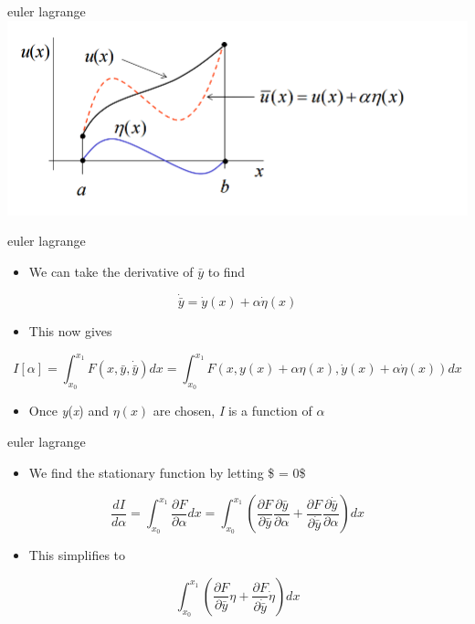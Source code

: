 \documentclass[
  letterpaper,
  ignorenonframetext,
  aspectratio=43,
  handout,
  12pt]{beamer}
\providecommand{\tightlist}{%
  \setlength{\itemsep}{0pt}\setlength{\parskip}{0pt}}
\providecommand{\tightlist}{%
\setlength{\itemsep}{0pt}\setlength{\parskip}{0pt}}
\let\Oldincludegraphics\includegraphics
\renewcommand{\includegraphics}[2][]{\Oldincludegraphics[width=\textwidth,height=0.7\textheight,keepaspectratio]{#2}}
\begin{document}
\begin{frame}{euler lagrange}
\protect\hypertarget{euler-lagrange-2}{}
\includegraphics{../images/variation.PNG}
\end{frame}

\begin{frame}{euler lagrange}
\protect\hypertarget{euler-lagrange-3}{}
\begin{itemize}
\tightlist
\item
  We can take the derivative of \(\bar{y}\) to find
\end{itemize}

\[\dot{\bar{y}} = \dot{y}(x) + \alpha \dot{\eta}(x)\]

\begin{itemize}
\tightlist
\item
  This now gives
\end{itemize}

\[I[\alpha] = \int_{x_0}^{x_1} F(x,\bar{y},\dot{\bar{y}})dx = \int_{x_0}^{x_1} F(x,y(x) + \alpha \eta(x),\dot{y}(x) + \alpha \dot{\eta}(x))dx\]

\begin{itemize}
\tightlist
\item
  Once \emph{y}(\emph{x}) and \(\eta(x)\) are chosen, \emph{I} is a
  function of \(\alpha\)
\end{itemize}
\end{frame}

\begin{frame}{euler lagrange}
\protect\hypertarget{euler-lagrange-4}{}
\begin{itemize}
\tightlist
\item
  We find the stationary function by letting \$ = 0\$
\end{itemize}

\[\frac{dI}{d \alpha} = \int_{x_0}^{x_1} \frac{\partial F}{\partial \alpha} dx =
  \int_{x_0}^{x_1} \left ( \frac{\partial F}{\partial \bar{y}}\frac{\partial \bar{y}}{\partial \alpha}  +
  \frac{\partial F}{\partial \dot{\bar{y}}}\frac{\partial \dot{\bar{y}}}{\partial \alpha}\right )dx\]

\begin{itemize}
\tightlist
\item
  This simplifies to
\end{itemize}

\[\int_{x_0}^{x_1} \left ( \frac{\partial F}{\partial \bar{y}}\eta  +
  \frac{\partial F}{\partial \dot{\bar{y}}}\dot{\eta}\right )dx\]
\end{frame}
\end{document}
